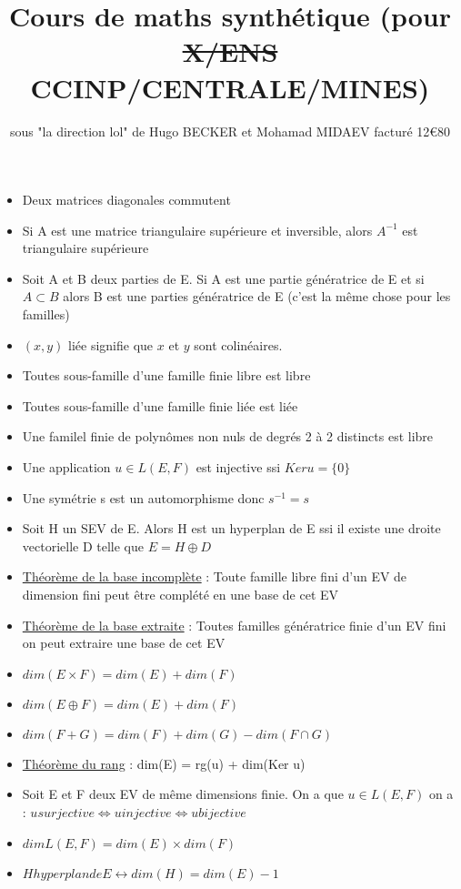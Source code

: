 \documentclass{book}
\title{Cours de maths synthétique (pour \sout{X/ENS} CCINP/CENTRALE/MINES)}
\author{sous "la direction lol" de Hugo BECKER et Mohamad MIDAEV facturé 12\euro 80}
\begin{document}
\maketitle

\begin{itemize}[label=$\ast$]
    	\item Deux matrices diagonales commutent
    	\item Si A est une matrice triangulaire supérieure et inversible, alors $A^{-1}$ est triangulaire supérieure
	\item Soit A et B deux parties de E. Si A est une partie génératrice de E et si \( A \subset B \) alors B est une parties génératrice de E (c'est la même chose pour les familles)
	\item \( (x,y) \) liée signifie que \( x \) et \( y \) sont colinéaires.
	\item Toutes sous-famille d'une famille finie libre est libre
	\item Toutes sous-famille d'une famille finie liée est liée
	\item Une familel finie de polynômes non nuls de degrés 2 à 2 distincts est libre
	\item Une application \(u \in L(E,F) \) est injective ssi \(Ker u = \{0\} \)
	\item Une symétrie s est un automorphisme donc \(s^{-1} = s \)
	\item Soit H un SEV de E. Alors H est un hyperplan de E ssi il existe une droite vectorielle D telle que \(E = H \oplus D \)
	\item \underline{Théorème de la base incomplète} : Toute famille libre fini d'un EV de dimension fini peut être complété en une base de cet EV
	\item \underline{Théorème de la base extraite} : Toutes familles génératrice finie d'un EV fini on peut extraire une base de cet EV
	\item \( dim(E \times F) = dim(E) + dim(F) \)
	\item \( dim(E \oplus F) = dim(E) + dim(F) \)
	\item \( dim(F + G) = dim(F) + dim(G) - dim(F \cap G) \)
	\item \underline{Théorème du rang} : dim(E)  = rg(u) + dim(Ker u)
	\item Soit E et F deux EV de même dimensions finie. On a que \(u \in L(E,F) \) on a : \( u surjective \Leftrightarrow u injective \Leftrightarrow u bijective \)
	\item \(dim L(E,F) = dim(E) \times dim(F) \)
	\item \( H hyperplan de E \leftrightarrow dim(H) = dim(E)-1 \)

\end{itemize}
\end{document}
